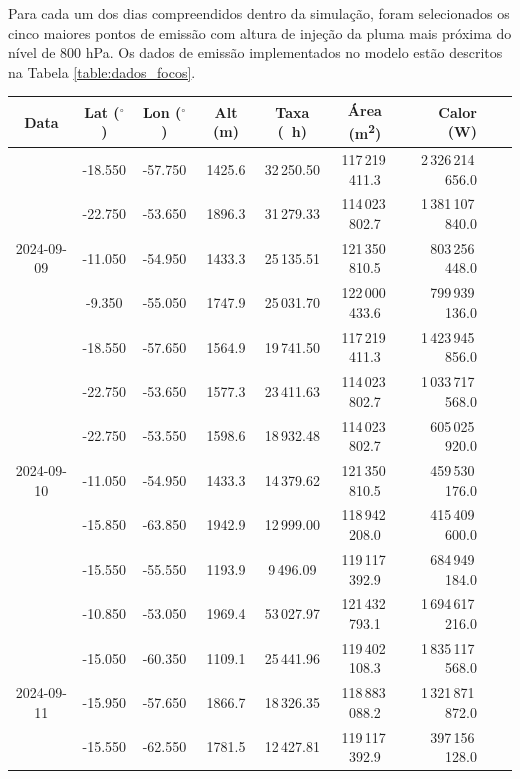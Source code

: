 	Para cada um dos dias compreendidos dentro da simulação, foram selecionados os cinco maiores pontos de emissão com altura de injeção da pluma mais próxima do nível de 800 hPa. Os dados de emissão implementados no modelo estão descritos na Tabela \ref{table:dados_focos}.
	
	
	\begin{table}[htbp]
		\centering
		\vspace{8pt}
		\small
		\begin{tabular}{ccccccrcc}
			\toprule
			\textbf{Data} & \textbf{Lat ($^\circ$)} & \textbf{Lon ($^\circ$)} & \textbf{Alt} (\unit{\meter}) & \textbf{Taxa} (\unit{\per\hour}) & \textbf{Área} (\unit{\meter\squared}) & \textbf{Calor} (\unit{\watt}) \\
			\midrule
			  & -18.550 & -57.750 & 1425.6 & 32\,250.50 & 117\,219\,411.3 & 2\,326\,214\,656.0 \\
			\multirow{3}{*}{2024-09-09} & -22.750 & -53.650 & 1896.3 & 31\,279.33 & 114\,023\,802.7 & 1\,381\,107\,840.0 \\
			  & -11.050 & -54.950 & 1433.3 & 25\,135.51 & 121\,350\,810.5 & 803\,256\,448.0 \\
			 & -9.350  & -55.050 & 1747.9 & 25\,031.70 & 122\,000\,433.6 & 799\,939\,136.0 \\
			 & -18.550 & -57.650 & 1564.9 & 19\,741.50 & 117\,219\,411.3 & 1\,423\,945\,856.0 \\
			\midrule
			 & -22.750 & -53.650 & 1577.3 & 23\,411.63 & 114\,023\,802.7 & 1\,033\,717\,568.0 \\
			\multirow{3}{*}{2024-09-10} & -22.750 & -53.550 & 1598.6 & 18\,932.48 & 114\,023\,802.7 & 605\,025\,920.0 \\
			 & -11.050 & -54.950 & 1433.3 & 14\,379.62 & 121\,350\,810.5 & 459\,530\,176.0 \\
			 & -15.850 & -63.850 & 1942.9 & 12\,999.00 & 118\,942\,208.0 & 415\,409\,600.0 \\
			 & -15.550 & -55.550 & 1193.9 & 9\,496.09  & 119\,117\,392.9 & 684\,949\,184.0 \\
			\midrule
			 & -10.850 & -53.050 & 1969.4 & 53\,027.97 & 121\,432\,793.1 & 1\,694\,617\,216.0 \\
			\multirow{3}{*}{2024-09-11} & -15.050 & -60.350 & 1109.1 & 25\,441.96 & 119\,402\,108.3 & 1\,835\,117\,568.0 \\
			 & -15.950 & -57.650 & 1866.7 & 18\,326.35 & 118\,883\,088.2 & 1\,321\,871\,872.0 \\
			 & -15.550 & -62.550 & 1781.5 & 12\,427.81 & 119\,117\,392.9 & 397\,156\,128.0 \\

\end{tabular}
\end{table}
